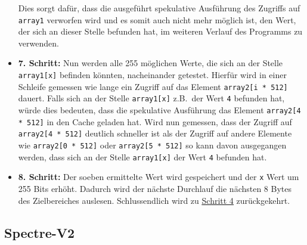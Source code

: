 \begin{itemize}
	      Dies sorgt dafür, dass die ausgeführt spekulative Ausführung des Zugriffs auf \texttt{array1} verworfen wird und es somit auch nicht mehr möglich ist, den Wert, der sich an dieser Stelle befunden hat, im weiteren Verlauf des Programms zu verwenden.
	\item \textbf{7. Schritt:} Nun werden alle 255 möglichen Werte, die sich an der Stelle \texttt{array1[x]} befinden könnten, nacheinander getestet.
	      Hierfür wird in einer Schleife gemessen wie lange ein Zugriff auf das Element \texttt{array2[i * 512]} dauert.
	      Falls sich an der Stelle \texttt{array1[x]} z.B.~der Wert \texttt{4} befunden hat, würde dies bedeuten, dass die spekulative Ausführung das Element \texttt{array2[4 * 512]} in den Cache geladen hat.
	      Wird nun gemessen, dass der Zugriff auf \texttt{array2[4 * 512]} deutlich schneller ist als der Zugriff auf andere Elemente wie \texttt{array2[0 * 512]} oder \texttt{array2[5 * 512]} so kann davon ausgegangen werden, dass sich an der Stelle \texttt{array1[x]} der Wert \texttt{4} befunden hat.
	\item \textbf{8. Schritt:} Der soeben ermittelte Wert wird gespeichert und der \texttt{x} Wert um 255 Bits erhöht.
	      Dadurch wird der nächste Durchlauf die nächsten 8 Bytes des Zielbereiches auslesen.
	      Schlussendlich wird zu \hyperref[itm:spectre_step4]{\underline{Schritt 4}} zurückgekehrt.
\end{itemize}

\subsection{Spectre-V2}
\label{subsec:spectre_spectre-v2}

